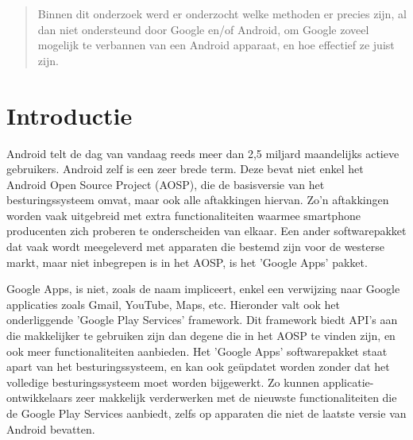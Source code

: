 \documentclass[a0,portrait]{a0poster}
\begin{document}

\begin{multicols}{2} %


\color{HoGentAccent1} %

\begin{abstract}
Binnen dit onderzoek werd er onderzocht welke methoden er precies zijn, al dan niet ondersteund door Google en/of Android, om Google zoveel mogelijk te verbannen van een Android apparaat, en hoe effectief ze juist zijn.
\end{abstract}

\setlength{\parskip}{\baselineskip}%
\setlength{\parindent}{0pt}%

\color{HoGentAccent1} 
\section*{Introductie}
\color{black}
\color{black}
Android telt de dag van vandaag reeds meer dan 2,5 miljard maandelijks actieve gebruikers. Android zelf is een zeer brede term. Deze bevat niet enkel het Android Open Source Project (AOSP), die de basisversie van het besturingssysteem omvat, maar ook alle aftakkingen hiervan. Zo'n aftakkingen worden vaak uitgebreid met extra functionaliteiten waarmee smartphone producenten zich proberen te onderscheiden van elkaar. Een ander softwarepakket dat vaak wordt meegeleverd met apparaten die bestemd zijn voor de westerse markt, maar niet inbegrepen is in het AOSP, is het 'Google Apps' pakket.

Google Apps, is niet, zoals de naam impliceert, enkel een verwijzing naar Google applicaties zoals Gmail, YouTube, Maps, etc. Hieronder valt ook het onderliggende 'Google Play Services' framework. Dit framework biedt API's aan die makkelijker te gebruiken zijn dan degene die in het AOSP te vinden zijn, en ook meer functionaliteiten aanbieden. Het 'Google Apps' softwarepakket staat apart van het besturingssysteem, en kan ook geüpdatet worden zonder dat het volledige besturingssysteem moet worden bijgewerkt. Zo kunnen applicatie-ontwikkelaars zeer makkelijk verderwerken met de nieuwste functionaliteiten die de Google Play Services aanbiedt, zelfs op apparaten die niet de laatste versie van Android bevatten.


\end{multicols}
\end{document}
